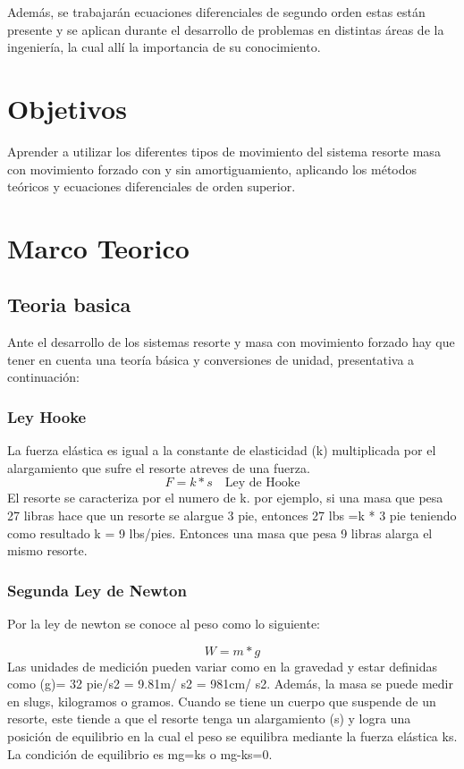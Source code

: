 \documentclass[12pt,a4paper]{article}
\begin{document}
	Además, se trabajarán ecuaciones diferenciales de segundo orden estas están presente y se aplican durante el desarrollo de problemas en distintas áreas de la ingeniería, la cual allí la importancia de su conocimiento. 
	\vspace{1cm}
	\section{Objetivos}
	Aprender a utilizar los diferentes tipos de movimiento del sistema resorte masa con movimiento forzado con y sin amortiguamiento, aplicando los métodos teóricos y ecuaciones diferenciales de orden superior. 
	\section{Marco Teorico}
	\subsection{Teoria basica}
	Ante el desarrollo de los sistemas resorte y masa con movimiento forzado hay que tener en cuenta una teoría básica y conversiones de unidad, presentativa a continuación: 

\subsubsection{Ley Hooke}
 
	La fuerza elástica es igual a la constante de elasticidad (k) multiplicada por el alargamiento que sufre el resorte atreves de una fuerza.\cite{01}
	\begin{equation}
	F= k * s \quad\text{Ley de Hooke}
  	\end{equation}
	El resorte se caracteriza por el numero de k. por ejemplo, si una masa que pesa 27 libras hace que un resorte se alargue 3 pie, entonces 27 lbs =k * 3 pie teniendo como resultado k = 9 lbs/pies. Entonces una masa que pesa 9 libras alarga el mismo resorte.
	\subsubsection{Segunda Ley de Newton}
	
	Por la ley de newton se conoce al peso como lo siguiente:
	 
 	\begin{equation}
W= m * g
\end{equation}
	Las unidades de medición pueden variar como en la gravedad y estar definidas como (g)= 32 pie/s2 = 9.81m/ s2 = 981cm/ s2.  Además, la masa se puede medir en slugs, kilogramos o gramos. 
	\vspace{1cm}
	\vfill
	Cuando se tiene un cuerpo que suspende de un resorte, este tiende a que el resorte tenga un alargamiento (s) y logra una posición de equilibrio en la cual el peso se equilibra mediante la fuerza elástica ks. La condición de equilibrio es mg=ks o mg-ks=0.
	
\end{document}
